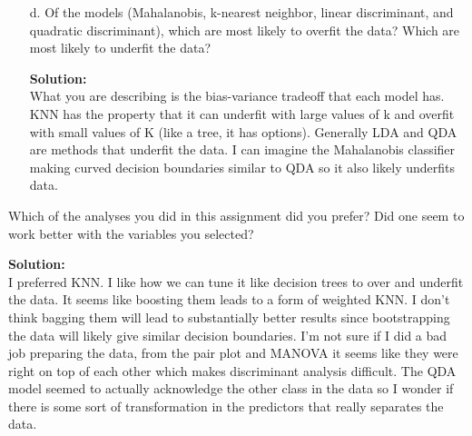 \documentclass[12pt]{article}
\makeatletter
\theoremstyle{homework}
\newenvironment{exercise}[1]
{\def\@currentlabel{#1}\exercisecore}
{\endexercisecore}
\newcommand{\localhead}[1]{\par\smallskip\noindent\textbf{#1}\nobreak\\}%
\newcommand\solution{\localhead{Solution:}}
\makeatother
\begin{document}
\begin{exercise}{4}
\begin{enumerate}
    \item[d.] Of the models (Mahalanobis, k-nearest neighbor, linear discriminant, and quadratic discriminant), which are most likely to overfit the data?
Which are most likely to underfit the data?\\
\solution What you are describing is the bias-variance tradeoff that each model has. KNN has the property that it can underfit with large values of k and overfit with small values of K (like a tree, it has options). 
Generally LDA and QDA are methods that underfit the data. I can imagine the Mahalanobis classifier making curved decision boundaries similar to QDA so it also likely underfits data. 

  \end{enumerate}
  
\end{exercise}
\vspace{.15in}

\begin{exercise}{5} Which of the analyses you did in this assignment did you prefer? Did one seem to work better with the variables you selected?\\
  \solution I preferred KNN. I like how we can tune it like decision trees to over and underfit the data. It seems like boosting them leads to a form of weighted KNN. I don't think bagging them 
  will lead to substantially better results since bootstrapping the data will likely give similar decision boundaries. I'm not sure if I did a bad job preparing the data, from the pair plot and MANOVA 
  it seems like they were right on top of each other which makes discriminant analysis difficult. The QDA model seemed to actually acknowledge the other class in the data so I wonder if there is some sort of 
  transformation in the predictors that really separates the data. 
\end{exercise}
\end{document}
